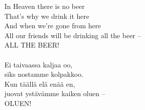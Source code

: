 
            In Heaven there is no beer \\
            That's why we drink it here \\
            And when we're gone from here \\
            All our friends will be drinking all the beer – \\
            ALL THE BEER! \\
\hspace{10mm} \\
            Ei taivaassa kaljaa oo, \\
            siks nostamme kolpakkoo. \\
            Kun täällä elä enää en, \\
            juovat ystävämme kaiken oluen – \\
            OLUEN! \\
